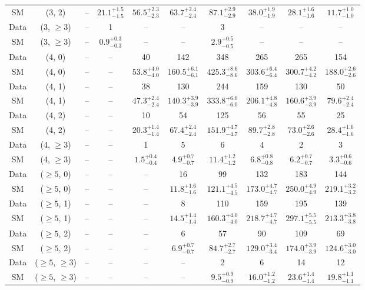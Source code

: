 \begin{table}[h!]
{\begin{tabular}{cccccccccc}
	SM & (3, 2) & -- & $21.1^{+ 1.5 }_{- 1.5 }$ & $56.5^{+ 2.3 }_{- 2.3 }$ & $63.7^{+ 2.4 }_{- 2.4 }$ & $87.1^{+ 2.9 }_{- 2.9 }$ & $38.0^{+ 1.9 }_{- 1.9 }$ & $28.1^{+ 1.6 }_{- 1.6 }$ & $11.7^{+ 1.0 }_{- 1.0 }$ \\[0.5ex] 
	Data & (3, $\ge3$) & -- & 1 & -- & -- & 3 & -- & -- & -- \\[0.5ex] 
	SM & (3, $\ge3$) & -- & $0.9^{+ 0.3 }_{- 0.3 }$ & -- & -- & $2.9^{+ 0.5 }_{- 0.5 }$ & -- & -- & -- \\[0.5ex] 
	Data & (4, 0) & -- & -- & 40 & 142 & 348 & 265 & 265 & 154 \\[0.5ex] 
	SM & (4, 0) & -- & -- & $53.8^{+ 4.0 }_{- 4.0 }$ & $160.5^{+ 6.1 }_{- 6.1 }$ & $425.3^{+ 8.6 }_{- 8.6 }$ & $303.6^{+ 6.4 }_{- 6.4 }$ & $300.7^{+ 4.2 }_{- 4.2 }$ & $188.0^{+ 2.6 }_{- 2.6 }$ \\[0.5ex] 
	Data & (4, 1) & -- & -- & 38 & 130 & 244 & 159 & 130 & 50 \\[0.5ex] 
	SM & (4, 1) & -- & -- & $47.3^{+ 2.4 }_{- 2.4 }$ & $140.3^{+ 3.9 }_{- 3.9 }$ & $333.8^{+ 6.0 }_{- 6.0 }$ & $206.1^{+ 4.8 }_{- 4.8 }$ & $160.6^{+ 3.9 }_{- 3.9 }$ & $79.6^{+ 2.4 }_{- 2.4 }$ \\[0.5ex] 
	Data & (4, 2) & -- & -- & 10 & 54 & 125 & 56 & 55 & 25 \\[0.5ex] 
	SM & (4, 2) & -- & -- & $20.3^{+ 1.4 }_{- 1.4 }$ & $67.4^{+ 2.4 }_{- 2.4 }$ & $151.9^{+ 4.7 }_{- 4.7 }$ & $89.7^{+ 2.8 }_{- 2.8 }$ & $73.0^{+ 2.6 }_{- 2.6 }$ & $28.4^{+ 1.6 }_{- 1.6 }$ \\[0.5ex] 
	Data & (4, $\ge3$) & -- & -- & 1 & 5 & 6 & 4 & 2 & 3 \\[0.5ex] 
	SM & (4, $\ge3$) & -- & -- & $1.5^{+ 0.4 }_{- 0.4 }$ & $4.9^{+ 0.7 }_{- 0.7 }$ & $11.4^{+ 1.2 }_{- 1.2 }$ & $6.8^{+ 0.8 }_{- 0.8 }$ & $6.2^{+ 0.7 }_{- 0.7 }$ & $3.3^{+ 0.6 }_{- 0.6 }$ \\[0.5ex] 
	Data & ($\ge5$, 0) & -- & -- & -- & 16 & 99 & 132 & 183 & 144 \\[0.5ex] 
	SM & ($\ge5$, 0) & -- & -- & -- & $11.8^{+ 1.6 }_{- 1.6 }$ & $121.1^{+ 4.5 }_{- 4.5 }$ & $173.0^{+ 4.7 }_{- 4.7 }$ & $250.0^{+ 4.9 }_{- 4.9 }$ & $219.1^{+ 3.2 }_{- 3.2 }$ \\[0.5ex] 
	Data & ($\ge5$, 1) & -- & -- & -- & 8 & 110 & 159 & 195 & 139 \\[0.5ex] 
	SM & ($\ge5$, 1) & -- & -- & -- & $14.5^{+ 1.4 }_{- 1.4 }$ & $160.3^{+ 4.0 }_{- 4.0 }$ & $218.7^{+ 4.7 }_{- 4.7 }$ & $297.1^{+ 5.5 }_{- 5.5 }$ & $213.3^{+ 3.8 }_{- 3.8 }$ \\[0.5ex] 
	Data & ($\ge5$, 2) & -- & -- & -- & 6 & 57 & 90 & 109 & 69 \\[0.5ex] 
	SM & ($\ge5$, 2) & -- & -- & -- & $6.9^{+ 0.7 }_{- 0.7 }$ & $84.7^{+ 2.7 }_{- 2.7 }$ & $129.0^{+ 3.4 }_{- 3.4 }$ & $174.0^{+ 3.9 }_{- 3.9 }$ & $124.6^{+ 3.0 }_{- 3.0 }$ \\[0.5ex] 
	Data & ($\ge5$, $\ge3$) & -- & -- & -- & -- & 2 & 6 & 14 & 12 \\[0.5ex] 
	SM & ($\ge5$, $\ge3$) & -- & -- & -- & -- & $9.5^{+ 0.9 }_{- 0.9 }$ & $16.0^{+ 1.2 }_{- 1.2 }$ & $23.6^{+ 1.4 }_{- 1.4 }$ & $19.8^{+ 1.1 }_{- 1.1 }$ \\[0.5ex] 
	\hline
	\hline
\end{tabular}}
\end{table}
